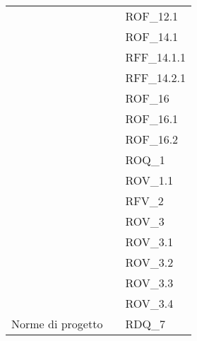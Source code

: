 \begin{xltabular}{\textwidth}{ p{0.3\textwidth} | X | p{0.2\textwidth} }
    &&ROF\_12.1\\ 
    &&ROF\_14.1\\ 
    &&RFF\_14.1.1\\ 
    &&RFF\_14.2.1\\ 
    &&ROF\_16\\ 
    &&ROF\_16.1\\ 
    &&ROF\_16.2\\ 
    &&ROQ\_1\\ 
    &&ROV\_1.1\\ 
    &&RFV\_2\\ 
    &&ROV\_3\\ 
    &&ROV\_3.1\\ 
    &&ROV\_3.2\\ 
    &&ROV\_3.3\\ 
    &&ROV\_3.4\\ 


    Norme di progetto & & RDQ\_7\\



\end{xltabular}
